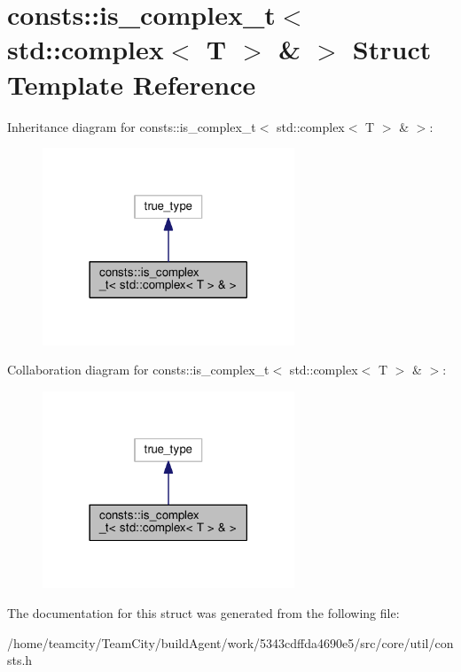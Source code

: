 \hypertarget{structconsts_1_1is__complex__t_3_01std_1_1complex_3_01T_01_4_01_6_01_4}{}\section{consts\+:\+:is\+\_\+complex\+\_\+t$<$ std\+:\+:complex$<$ T $>$ \& $>$ Struct Template Reference}
\label{structconsts_1_1is__complex__t_3_01std_1_1complex_3_01T_01_4_01_6_01_4}


Inheritance diagram for consts\+:\+:is\+\_\+complex\+\_\+t$<$ std\+:\+:complex$<$ T $>$ \& $>$\+:\nopagebreak
\begin{figure}[H]
\begin{center}
\leavevmode
\includegraphics[width=213pt]{structconsts_1_1is__complex__t_3_01std_1_1complex_3_01T_01_4_01_6_01_4__inherit__graph}
\end{center}
\end{figure}


Collaboration diagram for consts\+:\+:is\+\_\+complex\+\_\+t$<$ std\+:\+:complex$<$ T $>$ \& $>$\+:\nopagebreak
\begin{figure}[H]
\begin{center}
\leavevmode
\includegraphics[width=213pt]{structconsts_1_1is__complex__t_3_01std_1_1complex_3_01T_01_4_01_6_01_4__coll__graph}
\end{center}
\end{figure}


The documentation for this struct was generated from the following file\+:\begin{DoxyCompactItemize}
\item 
/home/teamcity/\+Team\+City/build\+Agent/work/5343cdffda4690e5/src/core/util/consts.\+h\end{DoxyCompactItemize}

